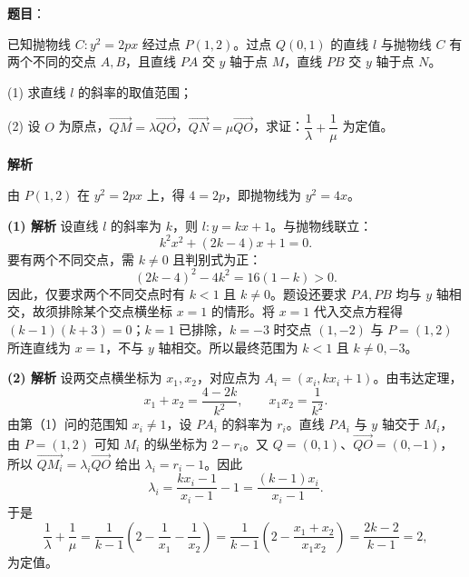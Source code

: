 \begin{answer}

\textbf{题目}：

已知抛物线 $C:y^2=2px$ 经过点 $P(1,2)$。过点 $Q(0,1)$ 的直线 $l$ 与抛物线 $C$ 有两个不同的交点 $A,B$，且直线 $PA$ 交 $y$ 轴于点 $M$，直线 $PB$ 交 $y$ 轴于点 $N$。

(1) 求直线 $l$ 的斜率的取值范围；

(2) 设 $O$ 为原点，$\overrightarrow{QM}=\lambda\overrightarrow{QO}$，$\overrightarrow{QN}=\mu\overrightarrow{QO}$，求证：$\dfrac1\lambda+\dfrac1\mu$ 为定值。

\textbf{解析}

由 $P(1,2)$ 在 $y^2=2px$ 上，得 $4=2p$，即抛物线为 $y^2=4x$。

\textbf{(1) 解析} 设直线 $l$ 的斜率为 $k$，则 $l:y=kx+1$。与抛物线联立：
\nopagebreak[4]
\[
k^2x^2+(2k-4)x+1=0.
\]
要有两个不同交点，需 $k\ne0$ 且判别式为正：
\nopagebreak[4]
\[
(2k-4)^2-4k^2=16(1-k)>0.
\]
因此，仅要求两个不同交点时有 $k<1$ 且 $k\ne0$。题设还要求 $PA,PB$ 均与 $y$ 轴相交，故须排除某个交点横坐标 $x=1$ 的情形。将 $x=1$ 代入交点方程得 $(k-1)(k+3)=0$；$k=1$ 已排除，$k=-3$ 时交点 $(1,-2)$ 与 $P=(1,2)$ 所连直线为 $x=1$，不与 $y$ 轴相交。所以最终范围为 $k<1$ 且 $k\ne0,-3$。

\textbf{(2) 解析} 设两交点横坐标为 $x_1,x_2$，对应点为 $A_i=(x_i,kx_i+1)$。由韦达定理，
\nopagebreak[4]
\[
x_1+x_2=\frac{4-2k}{k^2},\qquad x_1x_2=\frac1{k^2}.
\]
由第（1）问的范围知 $x_i\ne1$，设 $PA_i$ 的斜率为 $r_i$。直线 $PA_i$ 与 $y$ 轴交于 $M_i$，由 $P=(1,2)$ 可知 $M_i$ 的纵坐标为 $2-r_i$。又 $Q=(0,1)$、$\overrightarrow{QO}=(0,-1)$，所以 $\overrightarrow{QM_i}=\lambda_i\overrightarrow{QO}$ 给出 $\lambda_i=r_i-1$。因此
\nopagebreak[4]
\[
\lambda_i=\frac{kx_i-1}{x_i-1}-1=\frac{(k-1)x_i}{x_i-1}.
\]
于是
\nopagebreak[4]
\[
\frac1\lambda+\frac1\mu
=\frac1{k-1}\left(2-\frac1{x_1}-\frac1{x_2}\right)
=\frac1{k-1}\left(2-\frac{x_1+x_2}{x_1x_2}\right)
=\frac{2k-2}{k-1}=2,
\]
为定值。



\end{answer}

